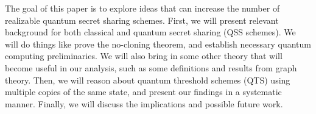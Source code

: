 The goal of this paper is to explore ideas that can increase the number of realizable quantum secret sharing schemes. First, we will present relevant background for both classical and quantum secret sharing (QSS schemes). We will do things like prove the no-cloning theorem, and establish necessary quantum computing preliminaries. We will also bring in some other theory that will become useful in our analysis, such as some definitions and results from graph theory. Then, we will reason about quantum threshold schemes (QTS) using multiple copies of the same state, and present our findings in a systematic manner. Finally, we will discuss the implications and possible future work.
